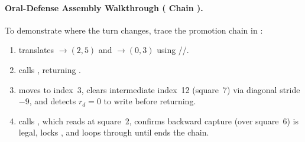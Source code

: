 \paragraph{Oral-Defense Assembly Walkthrough ( Chain ).}
To demonstrate where the turn changes, trace the promotion chain in :
\begin{enumerate}
    \item {} translates  $\to (2,5)$ and  $\to (0,3)$ using //.
    \item {} calls , returning .
    \item {} moves  to index~3, clears intermediate index~12 (square~7) via diagonal stride $-9$, and detects $r_d = 0$ to write  before returning.
    \item {} calls , which reads  at square~2, confirms backward capture  (over square~6) is legal, locks , and loops through  until  ends the chain.
\end{enumerate}
